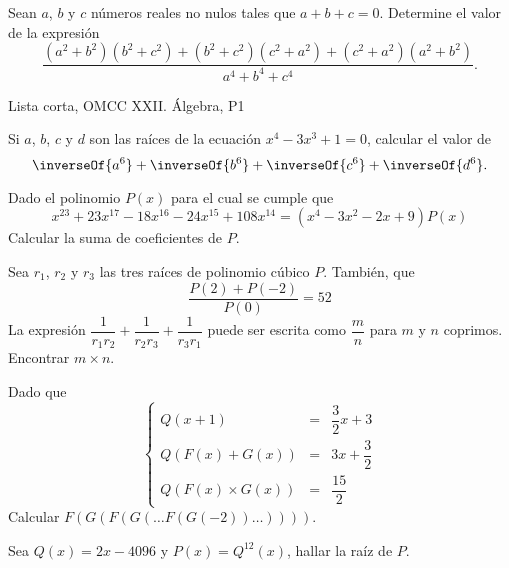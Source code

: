 \begin{section-problem}
    Sean $a$, $b$ y $c$ números reales no nulos tales que $a + b + c = 0$.
    Determine el valor de la expresión
    \[\frac{(a^2 + b^2)(b^2 + c^2) + (b^2 + c^2)(c^2 + a^2) + (c^2 + a^2)(a^2 + b^2)}{a^4 + b^4 + c^4}.\]
    \begin{source-problem}
        Lista corta, OMCC XXII. Álgebra, P1
    \end{source-problem}
\end{section-problem}

\begin{section-problem}
    Si $a$, $b$, $c$ y $d$ son las raíces de la ecuación $x^4 - 3x^3 + 1 = 0$,
    calcular el valor de
    \[\inverseOf{a^6} + \inverseOf{b^6} + \inverseOf{c^6} + \inverseOf{d^6}.\]
\end{section-problem}



\begin{section-problem}
    Dado el polinomio $P(x)$ para el cual se cumple que
    \[x^{23} + 23x^{17} - 18x^{16} - 24x^{15} + 108x^{14} = (x^4 - 3x^2 - 2x + 9)P(x)\]
    Calcular la suma de coeficientes de $P$.
\end{section-problem}

\begin{section-problem}
    Sea $r_1$, $r_2$ y $r_3$ las tres raíces de polinomio cúbico $P$.
    También, que
    \[
        \frac{P(2) + P(-2)}{P(0)} = 52
    \]
    La expresión $\dfrac{1}{r_1 r_2} + \dfrac{1}{r_2 r_3} + \dfrac{1}{r_3 r_1}$ puede ser escrita como $\dfrac{m}{n}$ para $m$ y $n$ coprimos.
    Encontrar $m\times n$.
\end{section-problem}

\begin{section-problem}
    Dado que
    \[
        \left\{
        \begin{array}{rcl}
            Q(x + 1) & =& \dfrac{3}{2} x + 3\\
            Q( F(x) + G(x) ) & =& 3x + \dfrac{3}{2}\\
            Q( F(x) \times G(x) ) & =& \dfrac{15}{2}
        \end{array}
        \right.
    \]
    Calcular $F(G(F(G(\dots F(G(-2))\dots))))$.
\end{section-problem}

\begin{section-problem}
    Sea $Q(x) = 2x - 4096$ y $P(x) = Q^{12}(x)$, hallar la raíz de $P$.
\end{section-problem}

